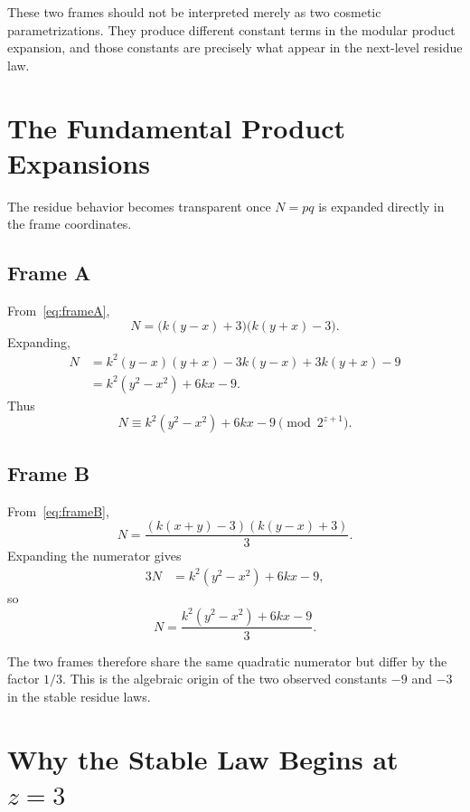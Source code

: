 \documentclass[11pt,a4paper]{article}
\theoremstyle{definition}
\theoremstyle{remark}
\begin{document}
These two frames should not be interpreted merely as two cosmetic parametrizations. They produce different constant terms in the modular product expansion, and those constants are precisely what appear in the next-level residue law.

\section{The Fundamental Product Expansions}

The residue behavior becomes transparent once $N=pq$ is expanded directly in the frame coordinates.

\subsection{Frame A}
From~\eqref{eq:frameA},
\begin{equation}
 N=
\bigl(k(y-x)+3\bigr)
\bigl(k(y+x)-3\bigr).
\end{equation}
Expanding,
\begin{align}
N
&=k^2(y-x)(y+x)
   -3k(y-x)
   +3k(y+x)
   -9
\\
&=k^2(y^2-x^2)+6kx-9.
\label{eq:Aproduct}
\end{align}
Thus
\begin{equation}
N\equiv k^2(y^2-x^2)+6kx-9
\pmod{2^{z+1}}.
\end{equation}

\subsection{Frame B}
From~\eqref{eq:frameB},
\begin{equation}
 N=
\frac{(k(x+y)-3)(k(y-x)+3)}{3}.
\end{equation}
Expanding the numerator gives
\begin{align}
3N
&=k^2(y^2-x^2)+6kx-9,
\end{align}
so
\begin{equation}
N=\frac{k^2(y^2-x^2)+6kx-9}{3}.
\label{eq:Bproduct}
\end{equation}

The two frames therefore share the same quadratic numerator but differ by the factor $1/3$. This is the algebraic origin of the two observed constants $-9$ and $-3$ in the stable residue laws.

\section{Why the Stable Law Begins at $z=3$}
\end{document}
